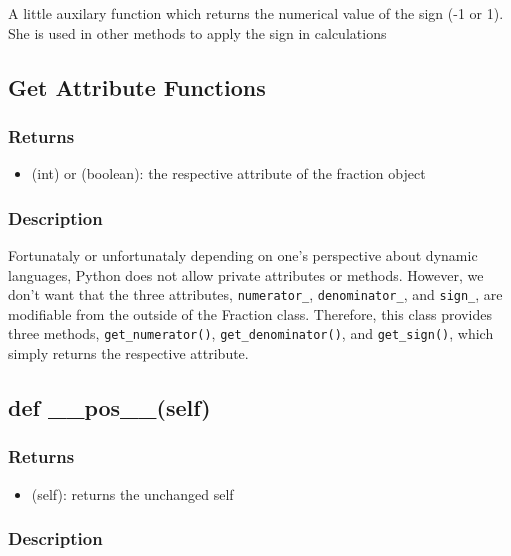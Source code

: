 \documentclass[refman]{scrartcl}
\begin{document}
A little auxilary function which returns the numerical value of the sign (-1 or 1). She is used in other methods to apply the sign in calculations

\subsection{Get Attribute Functions}

\subsubsection*{Returns}

\begin{itemize}
	\item (int) or (boolean): the respective attribute of the fraction object
\end{itemize}

\subsubsection*{Description}

Fortunataly or unfortunataly depending on one's perspective about dynamic languages, Python does not allow private attributes or methods. However, we don't want that the three attributes, \texttt{numerator\_}, \texttt{denominator\_}, and \texttt{sign\_}, are modifiable from the outside of the Fraction class. Therefore, this class provides three methods, \texttt{get\_numerator()}, \texttt{get\_denominator()}, and \texttt{get\_sign()}, which simply returns the respective attribute.

\subsection{def \_\_pos\_\_(self)}

\subsubsection*{Returns}

\begin{itemize}
  \item (self): returns the unchanged self
\end{itemize}

\subsubsection*{Description}
\end{document}
